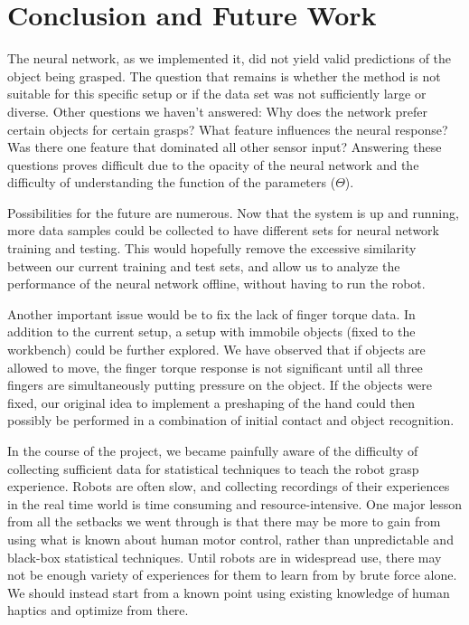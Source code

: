 \renewcommand{\thesection}{\Roman{section}}
\section{Conclusion and Future Work}
The neural network, as we implemented it, did not yield valid predictions of the object being grasped. The question that remains is whether the method is not suitable for this specific setup or if the data set was not sufficiently large or diverse. Other questions we haven't answered: Why does the network prefer certain objects for certain grasps? What feature influences the neural response? Was there one feature that dominated all other sensor input? Answering these questions proves difficult due to the opacity of the neural network and the difficulty of understanding the function of the parameters ($\Theta$).

Possibilities for the future are numerous. Now that the system is up and running, more data samples could be collected to have different sets for neural network training and testing. This would hopefully remove the excessive similarity between our current training and test sets, and allow us to analyze the performance of the neural network offline, without having to run the robot.

Another important issue would be to fix the lack of finger torque data. In addition to the current setup, a setup with immobile objects (fixed to the workbench) could be further explored. We have observed that if objects are allowed to move, the finger torque response is not significant until all three fingers are simultaneously putting pressure on the object. If the objects were fixed, our original idea to implement a preshaping of the hand could then possibly be performed in a combination of initial contact and object recognition. 

In the course of the project, we became painfully aware of the difficulty of collecting sufficient data for statistical techniques to teach the robot grasp experience. Robots are often slow, and collecting recordings of their experiences in the real time world is time consuming and resource-intensive. One major lesson from all the setbacks we went through is that there may be more to gain from using what is known about human motor control, rather than unpredictable and black-box statistical techniques. Until robots are in widespread use, there may not be enough variety of experiences for them to learn from by brute force alone. We should instead start from a known point using existing knowledge of human haptics and optimize from there.
\\







 
                    

